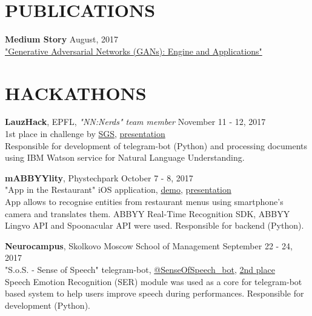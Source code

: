 \documentclass[margin, 9pt]{res} %
\begin{document}
\begin{resume}

\section{PUBLICATIONS}

\textbf{Medium Story} \hfill August, 2017 \\
\href{https://blog.statsbot.co/generative-adversarial-networks-gans-engine-and-applications-f96291965b47}{"Generative Adversarial Networks (GANs): Engine and Applications"}


\section{HACKATHONS}

\textbf{LauzHack}, EPFL, {\sl "NN:Nerds" team member} \hfill November 11 - 12, 2017 \\
1st place in challenge by \href{http://www.sgs.com}{SGS}, \href{https://akarazeev.github.io/data/Presentation_NNNerds.pdf}{presentation}\\
Responsible for development of telegram-bot (Python) and processing documents using IBM Watson service for Natural Language Understanding.

\textbf{mABBYYlity}, Phystechpark  \hfill October 7 - 8, 2017 \\
"App in the Restaurant" iOS application, \href{https://youtu.be/YNgUMhhqIrs}{demo}, \href{https://akarazeev.github.io/data/app_in_the_restaurant.pdf}{presentation}\\
App allows to recognise entities from restaurant menus using smartphone's camera and translates them. ABBYY Real-Time Recognition SDK, ABBYY Lingvo API and Spoonacular API were used. Responsible for backend (Python).

\textbf{Neurocampus}, Skolkovo Moscow School of Management  \hfill September 22 - 24, 2017 \\
"S.o.S. - Sense of Speech" telegram-bot, \href{https://t.me/senseofspeech_bot}{@SenseOfSpeech\_bot}, \href{https://akarazeev.github.io/data/telegram_diploma_sos.PDF}{2nd place}\\
Speech Emotion Recognition (SER) module was used as a core for telegram-bot based system to help users improve speech during performances. Responsible for development (Python).


\end{resume}
\end{document}
